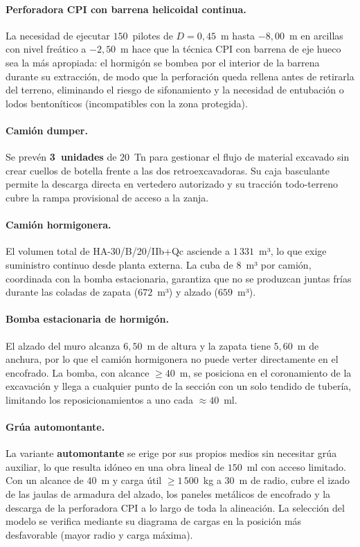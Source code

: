 \paragraph{Perforadora CPI con barrena helicoidal continua.}
La necesidad de ejecutar $150$~pilotes de $D = 0{,}45$~m hasta $-8{,}00$~m en arcillas
con nivel freático a $-2{,}50$~m hace que la técnica CPI con barrena de eje hueco sea
la más apropiada: el hormigón se bombea por el interior de la barrena durante su
extracción, de modo que la perforación queda rellena antes de retirarla del
terreno, eliminando el riesgo de sifonamiento y la necesidad de entubación o
lodos bentoníticos (incompatibles con la zona protegida).

\paragraph{Camión dumper.}
Se prevén \textbf{3~unidades} de $20$~Tn para gestionar el flujo de material
excavado sin crear cuellos de botella frente a las dos retroexcavadoras. Su caja
basculante permite la descarga directa en vertedero autorizado y su tracción
todo-terreno cubre la rampa provisional de acceso a la zanja.

\paragraph{Camión hormigonera.}
El volumen total de HA-30/B/20/IIb+Qc asciende a $1\,331$~m³, lo que exige
suministro continuo desde planta externa. La cuba de $8$~m³ por camión,
coordinada con la bomba estacionaria, garantiza que no se produzcan juntas frías
durante las coladas de zapata ($672$~m³) y alzado ($659$~m³).

\paragraph{Bomba estacionaria de hormigón.}
El alzado del muro alcanza $6{,}50$~m de altura y la zapata tiene $5{,}60$~m de
anchura, por lo que el camión hormigonera no puede verter directamente en el
encofrado. La bomba, con alcance $\geq 40$~m, se posiciona en el coronamiento de
la excavación y llega a cualquier punto de la sección con un solo tendido de
tubería, limitando los reposicionamientos a uno cada $\approx 40$~ml.

\paragraph{Grúa automontante.}
La variante \textbf{automontante} se erige por sus propios medios sin necesitar
grúa auxiliar, lo que resulta idóneo en una obra lineal de $150$~ml con acceso
limitado. Con un alcance de $40$~m y carga útil $\geq 1\,500$~kg a $30$~m de radio,
cubre el izado de las jaulas de armadura del alzado, los paneles metálicos de
encofrado y la descarga de la perforadora CPI a lo largo de toda la alineación.
La selección del modelo se verifica mediante su diagrama de cargas en la posición
más desfavorable (mayor radio y carga máxima).


